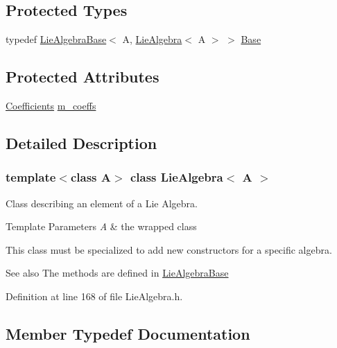 \subsection*{Protected Types}
\begin{DoxyCompactItemize}
\item 
typedef \hyperlink{class_lie_algebra_base}{Lie\+Algebra\+Base}$<$ A, \hyperlink{class_lie_algebra}{Lie\+Algebra}$<$ A $>$ $>$ \hyperlink{class_lie_algebra_a28bc019eb9b070751abe554b0de567f4}{Base}
\end{DoxyCompactItemize}
\subsection*{Protected Attributes}
\begin{DoxyCompactItemize}
\item 
\hyperlink{class_lie_algebra_a366fde92cd31cf93be87fe82952c8ebb}{Coefficients} \hyperlink{class_lie_algebra_a00c8e1711af4458171c63741aec83ffc}{m\+\_\+coeffs}
\end{DoxyCompactItemize}


\subsection{Detailed Description}
\subsubsection*{template$<$class A$>$\newline
class Lie\+Algebra$<$ A $>$}

Class describing an element of a Lie Algebra. 


\begin{DoxyTemplParams}{Template Parameters}
{\em A} & the wrapped class\\
\hline
\end{DoxyTemplParams}
This class must be specialized to add new constructors for a specific algebra.

\begin{DoxySeeAlso}{See also}
The methods are defined in \hyperlink{class_lie_algebra_base}{Lie\+Algebra\+Base} 
\end{DoxySeeAlso}


Definition at line 168 of file Lie\+Algebra.\+h.



\subsection{Member Typedef Documentation}
\hypertarget{class_lie_algebra_a28bc019eb9b070751abe554b0de567f4}{}\label{class_lie_algebra_a28bc019eb9b070751abe554b0de567f4} 

